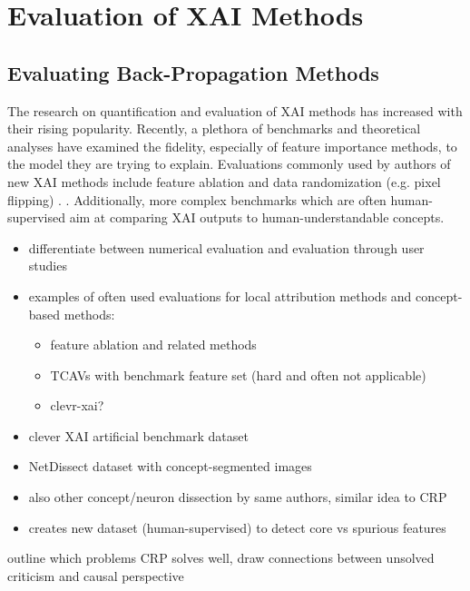 \section{Evaluation of XAI Methods}



\subsection{Evaluating Back-Propagation Methods}
\label{subsection:evaluation_critique}
The research on quantification and evaluation of XAI methods has increased with their rising popularity. Recently, a plethora of benchmarks and theoretical analyses have examined the fidelity, especially of feature importance methods, to the model they are trying to explain. Evaluations commonly used by authors of new XAI methods include feature ablation and data randomization (e.g. pixel flipping) . . Additionally, more complex benchmarks \cite{Kim2018, Arras2022, Bau2017, Singla2022} which are often human-supervised aim at comparing XAI outputs to human-understandable concepts. 


\begin{itemize}
      \item differentiate between numerical evaluation and evaluation through user studies
      \item examples of often used evaluations for local attribution methods and concept-based methods:
            \begin{itemize}
                  \item feature ablation and related methods
                  \item TCAVs \cite{Kim2018} with benchmark feature set (hard and often not applicable)
                  \item clevr-xai? \cite{Arras2022}
            \end{itemize}
      \item clever XAI artificial benchmark dataset \cite{Arras2022}
      \item NetDissect dataset with concept-segmented images \cite{Bau2017}
      \item also other concept/neuron dissection by same authors, similar idea to CRP \cite{Bau2020}
      \item creates new dataset (human-supervised) to detect core vs spurious features \cite{Singla2022}
\end{itemize}
{\color{red} outline which problems CRP solves well, draw connections between unsolved criticism and causal perspective}

